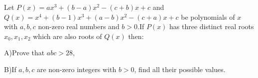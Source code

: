 Let $P(x)=ax^3+(b-a)x^2-(c+b)x+c$ and $Q(x)=x^4+(b-1)x^3+(a-b)x^2-(c+a)x+c$ be polynomials of $x$ with $a,b,c$ non-zero real numbers and $b>0$.If $P(x)$ has three distinct real roots $x_0,x_1,x_2$ which are also roots of $Q(x)$ then:

A)Prove that $abc>28$, 

B)If $a,b,c$ are non-zero integers with $b>0$, find all their possible values.